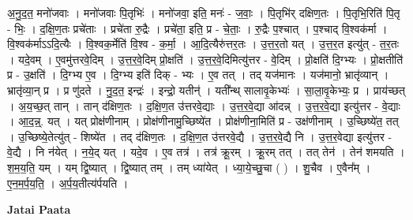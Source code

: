 \documentclass[17pt]{extarticle}
\begin{document}
अ॒नु॒द॒त॒ मनो॑जवाः । मनो॑जवाः पि॒तृभिः॑ । मनो॑जवा॒ इति॒ मनः॑ - ज॒वाः॒ । पि॒तृभि॑र् दक्षिण॒तः । पि॒तृभि॒रिति॑ पि॒तृ - भिः॒ । द॒क्षि॒ण॒तः प्रचे॑ताः । प्रचे॑ता रु॒द्रैः । प्रचे॑ता॒ इति॒ प्र - चे॒ताः॒ । रु॒द्रैः प॒श्चात् । प॒श्चाद् वि॒श्वक॑र्मा । वि॒श्वक॑र्माऽऽदि॒त्यैः । वि॒श्वक॒र्मेति॑ वि॒श्व - क॒र्मा॒ । आ॒दि॒त्यैरु॑त्तर॒तः । उ॒त्त॒र॒तो यत् । उ॒त्त॒र॒त इत्यु॑त् - त॒र॒तः । यदे॒वम् । ए॒वमु॑त्तरवे॒दिम् । उ॒त्त॒र॒वे॒दिम् प्रो॒क्षति॑ । उ॒त्त॒र॒वे॒दिमित्यु॑त्तर - वे॒दिम् । प्रो॒क्षति॑ दि॒ग्भ्यः । प्रो॒क्षतीति॑ प्र - उ॒क्षति॑ । दि॒ग्भ्य ए॒व । दि॒ग्भ्य इति॑ दिक् - भ्यः । ए॒व तत् । तद् यज॑मानः । यज॑मानो॒ भ्रातृ॑व्यान् । भ्रातृ॑व्या॒न् प्र । प्र णु॑दते । नु॒द॒त॒ इन्द्रः॑ । इन्द्रो॒ यतीन्॑ । यती᳚न्थ् सालावृ॒केभ्यः॑ । सा॒ला॒वृ॒केभ्यः॒ प्र । प्राय॑च्छत् । अ॒य॒च्छ॒त् तान् । तान् द॑क्षिण॒तः । द॒क्षि॒ण॒त उ॑त्तरवे॒द्याः । उ॒त्त॒र॒वे॒द्या आ॑दन्न् । उ॒त्त॒र॒वे॒द्या इत्यु॑त्तर - वे॒द्याः । आ॒द॒न्न्॒. यत् । यत् प्रोक्ष॑णीनाम् । प्रोक्ष॑णीनामु॒च्छिष्ये॑त । प्रोक्ष॑णीना॒मिति॑ प्र - उक्ष॑णीनाम् । उ॒च्छिष्ये॑त॒ तत् । उ॒च्छिष्ये॒तेत्यु॑त् - शिष्ये॑त । तद् द॑क्षिण॒तः । द॒क्षि॒ण॒त उ॑त्तरवे॒द्यै । उ॒त्त॒र॒वे॒द्यै नि । उ॒त्त॒र॒वेद्या इत्यु॑त्तर - वे॒द्यै । नि न॑येत् । न॒ये॒द् यत् । यदे॒व । ए॒व तत्र॑ । तत्र॑ क्रू॒रम् । क्रू॒रम् तत् । तत् तेन॑ । तेन॑ शमयति । श॒म॒य॒ति॒ यम् । यम् द्वि॒ष्यात् । द्वि॒ष्यात् तम् । तम् ध्या॑येत् । ध्या॒ये॒च्छु॒चा ( ) । शु॒चैव । ए॒वैन᳚म् । ए॒न॒म॒र्प॒य॒ति॒ । अ॒र्प॒य॒तीत्य॑र्पयति । \newline

\textbf{Jatai Paata} \newline
\end{document}
